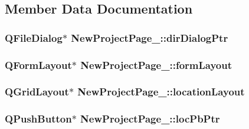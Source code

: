 \subsection{Member Data Documentation}
\hypertarget{class_new_project_page__2_a8cf80ba2a09ce1963365aae0f65a65e7}{
\subsubsection[{dir\-Dialog\-Ptr}]{\setlength{\rightskip}{0pt plus 5cm}Q\-File\-Dialog$\ast$ New\-Project\-Page\-\_\-::dir\-Dialog\-Ptr\hspace{0.3cm}{\ttfamily [private]}}}\label{class_new_project_page__2_a8cf80ba2a09ce1963365aae0f65a65e7}
\hypertarget{class_new_project_page__2_afc89c432c8c3cd4740e4a98bbe5f426b}{
\subsubsection[{form\-Layout}]{\setlength{\rightskip}{0pt plus 5cm}Q\-Form\-Layout$\ast$ New\-Project\-Page\-\_\-::form\-Layout\hspace{0.3cm}{\ttfamily [private]}}}\label{class_new_project_page__2_afc89c432c8c3cd4740e4a98bbe5f426b}
\hypertarget{class_new_project_page__2_a17fd912b11ae2dad02da7fa3906f948d}{
\subsubsection[{location\-Layout}]{\setlength{\rightskip}{0pt plus 5cm}Q\-Grid\-Layout$\ast$ New\-Project\-Page\-\_\-::location\-Layout\hspace{0.3cm}{\ttfamily [private]}}}\label{class_new_project_page__2_a17fd912b11ae2dad02da7fa3906f948d}
\hypertarget{class_new_project_page__2_ab5056e3d84ca52cffb2842c398ee04b2}{
\subsubsection[{loc\-Pb\-Ptr}]{\setlength{\rightskip}{0pt plus 5cm}Q\-Push\-Button$\ast$ New\-Project\-Page\-\_\-::loc\-Pb\-Ptr\hspace{0.3cm}{\ttfamily [private]}}}\label{class_new_project_page__2_ab5056e3d84ca52cffb2842c398ee04b2}
